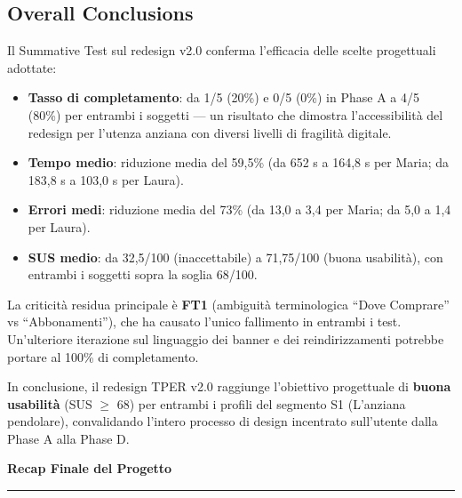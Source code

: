 ﻿\documentclass[11pt,a4paper]{article}
\begin{document}
\subsection*{Overall Conclusions}
\begin{tcolorbox}[base]
Il Summative Test sul redesign v2.0 conferma l'efficacia delle
scelte progettuali adottate:

\begin{itemize}[leftmargin=*]
  \item \textbf{Tasso di completamento}: da 1/5 (20\%) e 0/5 (0\%)
  in Phase A a 4/5 (80\%) per entrambi i soggetti --- un risultato
  che dimostra l'accessibilità del redesign per l'utenza anziana
  con diversi livelli di fragilità digitale.
  \item \textbf{Tempo medio}: riduzione media del 59,5\% (da
  652 s a 164,8 s per Maria; da 183,8 s a 103,0 s per Laura).
  \item \textbf{Errori medi}: riduzione media del 73\% (da 13,0
  a 3,4 per Maria; da 5,0 a 1,4 per Laura).
  \item \textbf{SUS medio}: da 32,5/100 (inaccettabile) a
  71,75/100 (buona usabilità), con entrambi i soggetti sopra
  la soglia 68/100.
\end{itemize}

\medskip

La criticità residua principale è \textbf{FT1} (ambiguità
terminologica ``Dove Comprare'' vs ``Abbonamenti''), che ha
causato l'unico fallimento in entrambi i test. Un'ulteriore
iterazione sul linguaggio dei banner e dei reindirizzamenti
potrebbe portare al 100\% di completamento.

\medskip

In conclusione, il redesign TPER v2.0 raggiunge l'obiettivo
progettuale di \textbf{buona usabilità} (SUS $\ge$ 68) per
entrambi i profili del segmento S1 (L'anziana pendolare),
convalidando l'intero processo di design incentrato sull'utente
dalla Phase A alla Phase D.
\end{tcolorbox}


\newpage
\begin{center}
  {\color{primaryColor}\LARGE\bfseries\sffamily Recap Finale del Progetto}\\[0.3cm]
  \color{borderColor}\hrule
\end{center}
\end{document}
